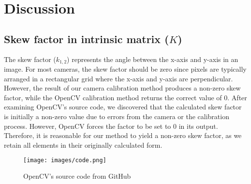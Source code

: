 \documentclass[12pt,letterpaper]{article}
\begin{document}
\section{Discussion}
\subsection{Skew factor in intrinsic matrix ($K$)}
The skew factor ($k_{1,2}$) represents the angle between the x-axis and y-axis in an image. For most cameras, the skew factor should be zero since pixels are typically arranged in a rectangular grid where the x-axis and y-axis are perpendicular. However, the result of our camera calibration method produces a non-zero skew factor, while the OpenCV calibration method returns the correct value of 0. After examining OpenCV's source code, we discovered that the calculated skew factor is initially a non-zero value due to errors from the camera or the calibration process. However, OpenCV forces the factor to be set to 0 in its output. Therefore, it is reasonable for our method to yield a non-zero skew factor, as we retain all elements in their originally calculated form.
\begin{figure}[htbp]
    \centering
    \texttt{[image: images/code.png]}
    \caption{OpenCV's source code from GitHub}
    \label{fig:code}
\end{figure}
\end{document}
